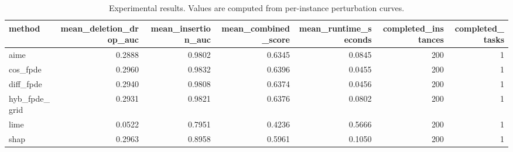 \begin{table}[t]
\caption{Experimental results. Values are computed from per-instance perturbation curves.}
\label{tab:main_results_computed}
\centering
\begin{tabular}{lrrrrrr}
\toprule
method & mean\_deletion\_drop\_auc & mean\_insertion\_auc & mean\_combined\_score & mean\_runtime\_seconds & completed\_instances & completed\_tasks \\
\midrule
aime & 0.2888 & 0.9802 & 0.6345 & 0.0845 & 200 & 1 \\
cos\_fpde & 0.2960 & 0.9832 & 0.6396 & 0.0455 & 200 & 1 \\
diff\_fpde & 0.2940 & 0.9808 & 0.6374 & 0.0456 & 200 & 1 \\
hyb\_fpde\_grid & 0.2931 & 0.9821 & 0.6376 & 0.0802 & 200 & 1 \\
lime & 0.0522 & 0.7951 & 0.4236 & 0.5666 & 200 & 1 \\
shap & 0.2963 & 0.8958 & 0.5961 & 0.1050 & 200 & 1 \\
\bottomrule
\end{tabular}

\end{table}
